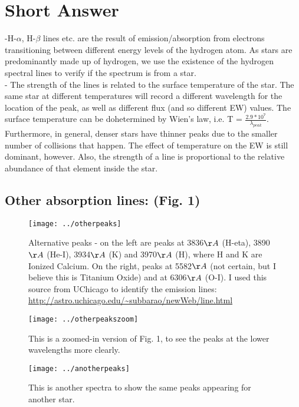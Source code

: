 \documentclass[12pt]{article}
\begin{document}
\section{Short Answer}


-H-$\alpha$, H-$\beta$ lines etc. are the result of emission/absorption from electrons transitioning between different energy levels of the hydrogen atom. As stars are predominantly made up of hydrogen, we use the existence of the hydrogen spectral lines to verify if the spectrum is from a star. \\
- The strength of the lines is related to the surface temperature of the star. The same star at different temperatures will record a different wavelength for the location of the peak, as well as different flux (and so different EW) values. The surface temperature can be dohetermined by Wien's law, i.e.
T = $ \frac{2.9*10^7}{\lambda_{peak}} $. Furthermore, in general, denser stars have thinner peaks due to the smaller number of collisions that happen. The effect of temperature on the EW is still dominant, however. Also, the strength of a line is proportional to the relative abundance of that element inside the star.

\subsection{ Other absorption lines: (Fig. 1) }
\begin{figure}
\texttt{[image: ../otherpeaks]}
\caption{Alternative peaks - on the left are peaks at 3836$\AA$ (H-eta), 3890$\AA$ (He-I), 3934$\AA$ (K) and 3970$\AA$ (H), where H and K are Ionized Calcium.   On the right, peaks at 5582$\AA$ (not certain, but I believe this is Titanium Oxide) and at 6306$\AA$ (O-I). I used this source from UChicago to identify the emission lines: \url{http://astro.uchicago.edu/~subbarao/newWeb/line.html}}
\end{figure}
\begin{figure}
\texttt{[image: ../otherpeakszoom]}\\
\caption{This is a zoomed-in version of Fig. 1, to see the peaks at the lower wavelengths more clearly.}
\end{figure}
\begin{figure}
\texttt{[image: ../anotherpeaks]}\\
\caption{This is another spectra to show the same peaks appearing for another star.}
\end{figure}
\end{document}
